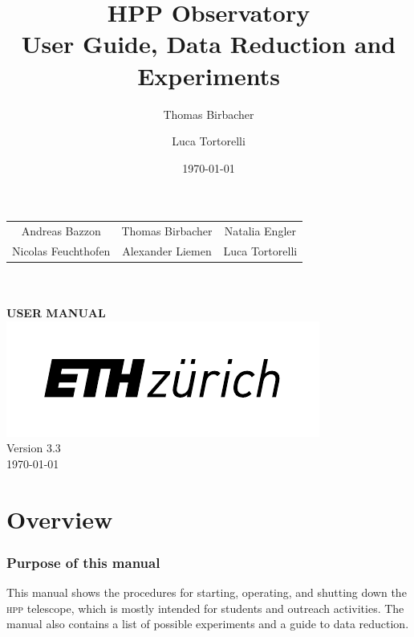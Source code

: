 \documentclass[a4paper, 11pt, fleqn]{memoir}
\begin{document}
\date{\today}
\author{Thomas Birbacher \and Luca Tortorelli}
\title{HPP Observatory \\ User Guide, Data Reduction and Experiments}


\begin{titlingpage}
    \begin{center}
        \vspace{4cm}
        {\large\bfseries
        \begin{tabular}{ccc}
            Andreas Bazzon & Thomas Birbacher & Natalia Engler\\
            Nicolas Feuchthofen & Alexander Liemen & Luca Tortorelli
        \end{tabular}
        }\\
        \vspace{3cm}
        {}\\
        \vspace{0.6cm}
        {\LARGE\bfseries {} USER MANUAL}\\
        \vfill
        \includegraphics{eth-logo}\\
        Version 3.3\\
        \today
    \end{center}
\end{titlingpage}

\newcommand{\software}[1]{\texttt{#1}}

\frontmatter

\chapter{Overview}

\subsection*{Purpose of this manual}

This manual shows the procedures for starting, operating, and shutting down the \textsc{hpp} telescope, which is mostly intended for students and outreach activities.
The manual also contains a list of possible experiments and a guide to data reduction.
\end{document}
